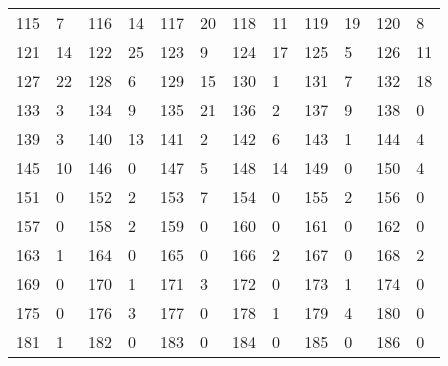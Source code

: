 \begin{longtable}{llllllllllll}
115 & 7&116 &14&117& 20&118 &11&119 &19&120& 8\\
121 & 14&122 &25&123& 9&124 &17&125 &5&126& 11\\
127 & 22&128 &6&129& 15&130 &1&131 &7&132& 18\\
133 & 3&134 &9&135& 21&136 &2&137 &9&138& 0\\
139 & 3&140 &13&141& 2&142 &6&143 &1&144& 4\\
145 & 10&146 &0&147& 5&148 &14&149 &0&150& 4\\
151 & 0&152 &2&153& 7&154 &0&155 &2&156& 0\\
157 & 0&158 &2&159& 0&160 &0&161 &0&162& 0\\
163 & 1&164 &0&165& 0&166 &2&167 &0&168& 2\\
169 & 0&170 &1&171& 3&172 &0&173 &1&174& 0\\
175 & 0&176 &3&177& 0&178 &1&179 &4&180& 0\\
181 & 1&182 &0&183& 0&184 &0&185 &0&186& 0\\
\bottomrule\end{longtable}
